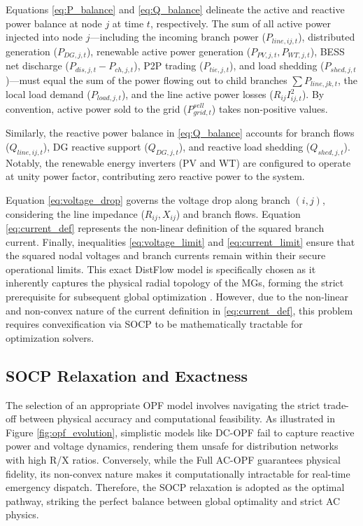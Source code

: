 Equations \eqref{eq:P_balance} and \eqref{eq:Q_balance} delineate the active and reactive power balance at node $j$ at time $t$, respectively. The sum of all active power injected into node $j$---including the incoming branch power ($P_{line,ij,t}$), distributed generation ($P_{DG,j,t}$), renewable active power generation ($P_{PV,j,t}, P_{WT,j,t}$), BESS net discharge ($P_{dis,j,t} - P_{ch,j,t}$), P2P trading ($P_{tie,j,t}$), and load shedding ($P_{shed,j,t}$)---must equal the sum of the power flowing out to child branches $\sum P_{line,jk,t}$, the local load demand ($P_{load,j,t}$), and the line active power losses ($R_{ij} I_{ij,t}^2$). By convention, active power sold to the grid ($P_{grid,t}^{sell}$) takes non-positive values. 

Similarly, the reactive power balance in \eqref{eq:Q_balance} accounts for branch flows ($Q_{line,ij,t}$), DG reactive support ($Q_{DG,j,t}$), and reactive load shedding ($Q_{shed,j,t}$). Notably, the renewable energy inverters (PV and WT) are configured to operate at unity power factor, contributing zero reactive power to the system.

Equation \eqref{eq:voltage_drop} governs the voltage drop along branch $(i,j)$, considering the line impedance ($R_{ij}, X_{ij}$) and branch flows. Equation \eqref{eq:current_def} represents the non-linear definition of the squared branch current. Finally, inequalities \eqref{eq:voltage_limit} and \eqref{eq:current_limit} ensure that the squared nodal voltages and branch currents remain within their secure operational limits. This exact DistFlow model is specifically chosen as it inherently captures the physical radial topology of the MGs, forming the strict prerequisite for subsequent global optimization \cite{Chowdhury2023_SOCP_ThreePhase}. However, due to the non-linear and non-convex nature of the current definition in \eqref{eq:current_def}, this problem requires convexification via SOCP to be mathematically tractable for optimization solvers.

\subsection{SOCP Relaxation and Exactness}
\label{subsec:socp_relaxation}

The selection of an appropriate OPF model involves navigating the strict trade-off between physical accuracy and computational feasibility. As illustrated in Figure \ref{fig:opf_evolution}, simplistic models like DC-OPF fail to capture reactive power and voltage dynamics, rendering them unsafe for distribution networks with high R/X ratios. Conversely, while the Full AC-OPF guarantees physical fidelity, its non-convex nature makes it computationally intractable for real-time emergency dispatch. Therefore, the SOCP relaxation is adopted as the optimal pathway, striking the perfect balance between global optimality and strict AC physics.

